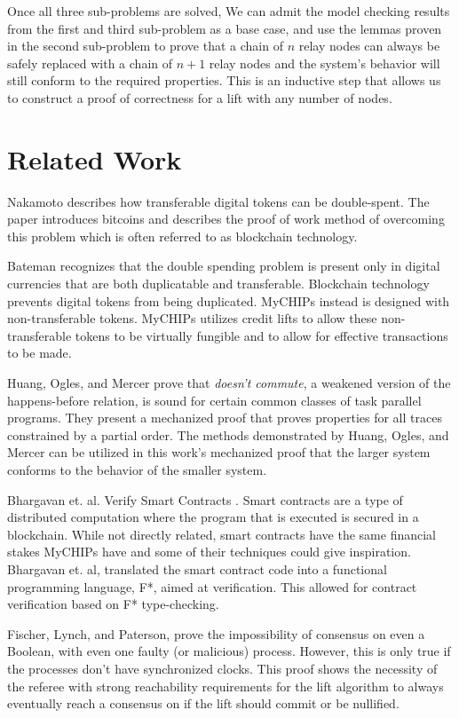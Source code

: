 \documentclass[article, onecolumn, 12pt]{IEEEtran}
\begin{document}
Once all three sub-problems are solved, We can admit the model checking results from the first and third sub-problem as a base case, and use the lemmas proven in the second sub-problem to prove that a chain of $n$ relay nodes can always be safely replaced with a chain of $n+1$ relay nodes and the system's behavior will still conform to the required properties. This is an inductive step that allows us to construct a proof of correctness for a lift with any number of nodes. 

\section{Related Work}
 
 Nakamoto describes how transferable digital tokens can be double-spent. The paper introduces bitcoins and describes the proof of work method of overcoming this problem which is often referred to as blockchain technology. \cite{bitcoin} 

 Bateman recognizes that the double spending problem is present only in digital currencies that are both duplicatable and transferable. Blockchain technology prevents digital tokens from being duplicated. MyCHIPs instead is designed with non-transferable tokens. MyCHIPs utilizes credit lifts to allow these non-transferable tokens to be virtually fungible and to allow for effective transactions to be made. 
 
 Huang, Ogles, and Mercer prove that \emph{doesn't commute}, a weakened version of the happens-before relation, is sound for certain common classes of task parallel programs. They present a mechanized proof that proves properties for all traces constrained by a partial order. The methods demonstrated by Huang, Ogles, and Mercer can be utilized in this work's mechanized proof that the larger system conforms to the behavior of the smaller system. \cite{ben_DC}

 Bhargavan et. al. Verify Smart Contracts \cite{SmartContracts}. Smart contracts are a type of distributed computation where the program that is executed is secured in a blockchain. While not directly related, smart contracts have the same financial stakes MyCHIPs have and some of their techniques could give inspiration.  Bhargavan et. al, translated the smart contract code into a functional programming language, F*, aimed at verification. This allowed for contract verification based on F* type-checking.
 
 
 Fischer, Lynch, and Paterson,\cite{Fischer} prove the impossibility of consensus on even a Boolean, with even one faulty (or malicious) process. However, this is only true if the processes don't have synchronized clocks. This proof shows the necessity of the referee with strong reachability requirements for the lift algorithm to always eventually reach a consensus on if the lift should commit or be nullified.
 
\end{document}
